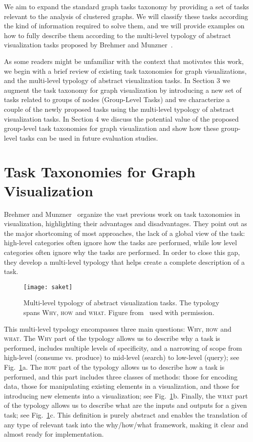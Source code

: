 \documentclass{article}
\begin{document}
We aim to expand the standard graph tasks taxonomy by providing a set of tasks relevant to the analysis of clustered graphs. We will classify these tasks according the kind of information required to solve them, and we will provide examples on how to fully describe them according to the multi-level typology of abstract visualization tasks proposed by Brehmer and Munzner~\cite{IV_Brehmer}.

As some readers might be unfamiliar with the context that motivates this work, we begin with a brief review of existing task taxonomies for graph visualizations, and the multi-level typology of abstract visualization tasks. In Section 3 we augment the task taxonomy for graph visualization by introducing a new set of tasks related to groups of nodes (Group-Level Tasks) and we characterize a couple of the newly proposed tasks using the multi-level typology of abstract visualization tasks. In Section 4 we discuss the potential value of the proposed group-level task taxonomies for graph visualization and show how these group-level tasks can be used in future evaluation studies. 


\section{Task Taxonomies for Graph Visualization}
Brehmer and Munzner~\cite{IV_Brehmer} organize the vast previous work on task taxonomies in visualization, highlighting their advantages and disadvantages. They point out as the major shortcoming of most approaches, the lack of a global view of the task: high-level categories often ignore how the tasks are performed, while low level categories often ignore why the tasks are performed. In order to close this gap, they develop a multi-level typology that helps create a complete description of a task.

\begin{figure}[t]
\centering
\texttt{[image: saket]}
\caption{Multi-level typology of abstract visualization tasks. The typology spans \textsc{Why, how} and \textsc{what}. Figure from~\cite{IV_Brehmer} used with permission.} \label{FIG:Munzner}
\end{figure}

This multi-level typology encompasses three main questions: \textsc{Why, how} and \textsc{what}. The \textsc{Why} part of the typology allows us to describe why a task is performed, includes multiple levels of specificity, and a narrowing of scope from high-level (consume vs. produce) to mid-level (search) to low-level (query); see Fig.~\ref{FIG:Munzner}a. The \textsc{how} part of the typology allows us to describe how a task is performed, and this part includes three classes of methods: those for encoding data, those for manipulating existing elements in a visualization, and those for introducing new elements into a visualization; see Fig.~\ref{FIG:Munzner}b. Finally, the \textsc{what} part of the typology allows us to describe what are the inputs and outputs for a given task; see Fig.~\ref{FIG:Munzner}c. This definition is purely abstract and enables the translation of any type of relevant task into the why/how/what framework, making it clear and almost ready for implementation. 
\end{document}
